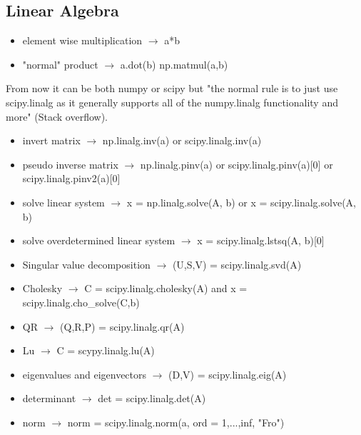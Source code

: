\documentclass{article}
\begin{document}
\begin{multicols}{2}
\section{Linear Algebra}
\begin{itemize}
\item element wise multiplication $\rightarrow$ a*b
\item "normal" product  $\rightarrow$ a.dot(b) np.matmul(a,b)
\end{itemize}
From now it can be both numpy or scipy but "the normal rule is to just use scipy.linalg as it generally supports all of the numpy.linalg functionality and more" (Stack overflow).
\begin{itemize}
\item invert matrix $\rightarrow$ np.linalg.inv(a) or scipy.linalg.inv(a)
\item pseudo inverse matrix $\rightarrow$ np.linalg.pinv(a) or scipy.linalg.pinv(a)[0] or scipy.linalg.pinv2(a)[0]
\item solve linear system  $\rightarrow$ x = np.linalg.solve(A, b) or x = scipy.linalg.solve(A, b)
\item solve  overdetermined linear system $\rightarrow$ x = scipy.linalg.lstsq(A, b)[0]
\item Singular value decomposition $\rightarrow$ (U,S,V) = scipy.linalg.svd(A)
\item Cholesky $\rightarrow$ C = scipy.linalg.cholesky(A) and x = scipy.linalg.cho\_solve(C,b)
\item QR $\rightarrow$ (Q,R,P) = scipy.linalg.qr(A)
\item Lu $\rightarrow$ C = scypy.linalg.lu(A)
\item eigenvalues and eigenvectors $\rightarrow$ (D,V) = scipy.linalg.eig(A)
\item determinant $\rightarrow$ det = scipy.linalg.det(A)
\item norm $\rightarrow$ norm = scipy.linalg.norm(a, ord = 1,...,inf, "Fro")
\end{itemize}


\end{multicols}
\end{document}

